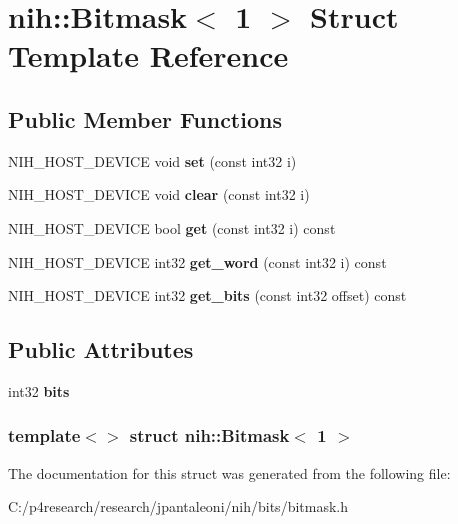 \hypertarget{structnih_1_1_bitmask_3_011_01_4}{
\section{nih\-:\-:\-Bitmask$<$ 1 $>$ \-Struct \-Template \-Reference}
\label{structnih_1_1_bitmask_3_011_01_4}
}
\subsection*{\-Public \-Member \-Functions}
\begin{DoxyCompactItemize}
\item 
\hypertarget{structnih_1_1_bitmask_3_011_01_4_a2858302dab752591497b780a4068606e}{
\-N\-I\-H\-\_\-\-H\-O\-S\-T\-\_\-\-D\-E\-V\-I\-C\-E void {\bfseries set} (const int32 i)}
\label{structnih_1_1_bitmask_3_011_01_4_a2858302dab752591497b780a4068606e}

\item 
\hypertarget{structnih_1_1_bitmask_3_011_01_4_af7d103f3e1350437258a698ac39d1c03}{
\-N\-I\-H\-\_\-\-H\-O\-S\-T\-\_\-\-D\-E\-V\-I\-C\-E void {\bfseries clear} (const int32 i)}
\label{structnih_1_1_bitmask_3_011_01_4_af7d103f3e1350437258a698ac39d1c03}

\item 
\hypertarget{structnih_1_1_bitmask_3_011_01_4_aa0b3d4b7dc3d3056a3e72bdcba23e662}{
\-N\-I\-H\-\_\-\-H\-O\-S\-T\-\_\-\-D\-E\-V\-I\-C\-E bool {\bfseries get} (const int32 i) const }
\label{structnih_1_1_bitmask_3_011_01_4_aa0b3d4b7dc3d3056a3e72bdcba23e662}

\item 
\hypertarget{structnih_1_1_bitmask_3_011_01_4_a755daa2cee0eef284c404208b77aca08}{
\-N\-I\-H\-\_\-\-H\-O\-S\-T\-\_\-\-D\-E\-V\-I\-C\-E int32 {\bfseries get\-\_\-word} (const int32 i) const }
\label{structnih_1_1_bitmask_3_011_01_4_a755daa2cee0eef284c404208b77aca08}

\item 
\hypertarget{structnih_1_1_bitmask_3_011_01_4_a79a87d98c90082bca8dce417441c57f2}{
\-N\-I\-H\-\_\-\-H\-O\-S\-T\-\_\-\-D\-E\-V\-I\-C\-E int32 {\bfseries get\-\_\-bits} (const int32 offset) const }
\label{structnih_1_1_bitmask_3_011_01_4_a79a87d98c90082bca8dce417441c57f2}

\end{DoxyCompactItemize}
\subsection*{\-Public \-Attributes}
\begin{DoxyCompactItemize}
\item 
\hypertarget{structnih_1_1_bitmask_3_011_01_4_a5a95ae7e543ea3cbfeb52f5a3ea087bb}{
int32 {\bfseries bits}}
\label{structnih_1_1_bitmask_3_011_01_4_a5a95ae7e543ea3cbfeb52f5a3ea087bb}

\end{DoxyCompactItemize}
\subsubsection*{template$<$$>$ struct nih\-::\-Bitmask$<$ 1 $>$}



\-The documentation for this struct was generated from the following file\-:\begin{DoxyCompactItemize}
\item 
\-C\-:/p4research/research/jpantaleoni/nih/bits/bitmask.\-h\end{DoxyCompactItemize}

